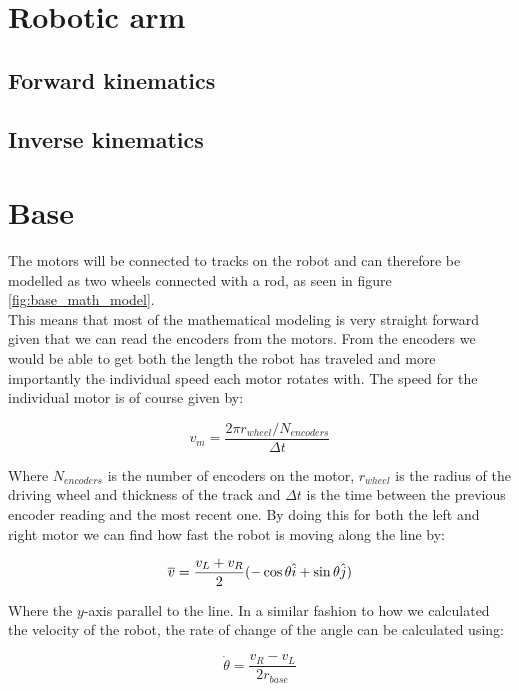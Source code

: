 \section*{Robotic arm}
\subsection*{Forward kinematics}
\subsection*{Inverse kinematics}



\section*{Base}

 The motors will be connected to tracks on the robot and can therefore be modelled as two wheels connected with a rod, as seen in figure \ref{fig:base_math_model}.\\ 
This means that most of the mathematical modeling is very straight forward given that we can read the encoders from the motors. From the encoders we would be able to get both the length the robot has traveled and more importantly the individual speed each motor rotates with. The speed for the individual motor is of course given by: 

\begin{equation}
    v_m=\frac{2\pi r_{wheel}/N_{encoders}}{\Delta t}
    \label{eq:base_system_eq1}
\end{equation}

\noindent Where $N_{encoders}$ is the number of encoders on the motor, $r_{wheel}$ is the radius of the driving wheel and thickness of the track and $\Delta t$ is the time between the previous encoder reading and the most recent one. By doing this for both the left and right motor we can find how fast the robot is moving along the line by:

\begin{equation}
    \overline{v}= \frac{v_L+v_R}{2}(-\cos \theta \hat{i}+ \sin \theta \Hat{j})
\end{equation}

\noindent Where the $y$-axis parallel to the line. In a similar fashion to how we calculated the velocity of the robot, the rate of change of the angle can be calculated using:

\begin{equation}
    \Dot{\theta} = \frac{v_R-v_L}{2r_{base}}
    \label{eq:base_system_eq2}
\end{equation}

